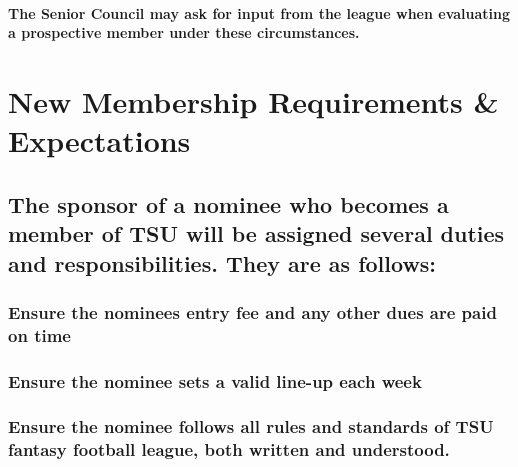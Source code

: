 \documentclass[
]{book}
\begin{document}
\hypertarget{the-senior-council-may-ask-for-input-from-the-league-when-evaluating-a-prospective-member-under-these-circumstances.}{%
\paragraph{The Senior Council may ask for input from the league when evaluating a prospective member under these circumstances.}\label{the-senior-council-may-ask-for-input-from-the-league-when-evaluating-a-prospective-member-under-these-circumstances.}}

\hypertarget{new-membership-requirements-expectations}{%
\section{New Membership Requirements \& Expectations}\label{new-membership-requirements-expectations}}

\hypertarget{the-sponsor-of-a-nominee-who-becomes-a-member-of-tsu-will-be-assigned-several-duties-and-responsibilities.-they-are-as-follows}{%
\subsection{The sponsor of a nominee who becomes a member of TSU will be assigned several duties and responsibilities. They are as follows:}\label{the-sponsor-of-a-nominee-who-becomes-a-member-of-tsu-will-be-assigned-several-duties-and-responsibilities.-they-are-as-follows}}

\hypertarget{ensure-the-nominees-entry-fee-and-any-other-dues-are-paid-on-time}{%
\subsubsection{Ensure the nominees entry fee and any other dues are paid on time}\label{ensure-the-nominees-entry-fee-and-any-other-dues-are-paid-on-time}}

\hypertarget{ensure-the-nominee-sets-a-valid-line-up-each-week}{%
\subsubsection{Ensure the nominee sets a valid line-up each week}\label{ensure-the-nominee-sets-a-valid-line-up-each-week}}

\hypertarget{ensure-the-nominee-follows-all-rules-and-standards-of-tsu-fantasy-football-league-both-written-and-understood.}{%
\subsubsection{Ensure the nominee follows all rules and standards of TSU fantasy football league, both written and understood.}\label{ensure-the-nominee-follows-all-rules-and-standards-of-tsu-fantasy-football-league-both-written-and-understood.}}
\end{document}

